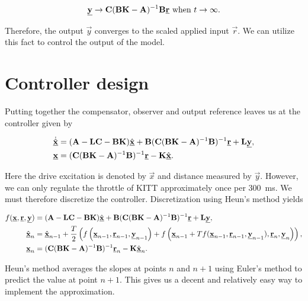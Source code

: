 \documentclass[11pt,titlepage]{report}
\begin{document}
\begin{equation}
	\mathbf{\underline{y}} \to \mathbf{C} (\mathbf{B} \mathbf{K} - \mathbf{A})^{-1} \mathbf{B} \mathbf{\underline{r}} \text{ when } t \to \infty.
\end{equation}

Therefore, the output $\vec{y}$ converges to the scaled applied input $\vec{r}$. We can utilize this fact to control the output of the model.

\section{Controller design}
Putting together the compensator, observer and output reference leaves us at the controller given by

\begin{align}
	\dot{\hat{\mathbf{\underline{x}}}} &= (\mathbf{A}-\mathbf{L}\mathbf{C}-\mathbf{B}\mathbf{K}) \hat{\mathbf{\underline{x}}} + \mathbf{B}(\mathbf{C}(\mathbf{B} \mathbf{K} - \mathbf{A})^{-1} \mathbf{B})^{-1} \mathbf{\underline{r}} + \mathbf{L} \mathbf{\underline{y}}, \\
	\mathbf{\underline{x}} &= (\mathbf{C}(\mathbf{B} \mathbf{K} - \mathbf{A})^{-1} \mathbf{B})^{-1} \mathbf{\underline{r}} - \mathbf{K} \hat{\mathbf{\underline{x}}}.
\end{align}

Here the drive excitation is denoted by $\vec{x}$ and distance measured by $\vec{y}$. However, we can only regulate the throttle of KITT approximately once per \SI{300}{ms}. We must therefore discretize the controller. Discretization using Heun's method \cite{wikipedia-heuns} yields

\begin{align}
	f(\mathbf{\underline{x}},\mathbf{\underline{r}},\mathbf{\underline{y}}) &= (\mathbf{A}-\mathbf{L}\mathbf{C}-\mathbf{B}\mathbf{K}) \hat{\mathbf{\underline{x}}} + \mathbf{B}(\mathbf{C}(\mathbf{B} \mathbf{K} - \mathbf{A})^{-1} \mathbf{B})^{-1} \mathbf{\underline{r}} + \mathbf{L} \mathbf{\underline{y}}, \\
	\hat{\mathbf{\underline{x}}}_n &= \hat{\mathbf{\underline{x}}}_{n-1} + \frac{T}{2} \left( f\left(\mathbf{\underline{x}}_{n-1},\mathbf{\underline{r}}_{n-1},\mathbf{\underline{y}}_{n-1} \right) + f\left( \mathbf{\underline{x}}_{n-1} + T f(\mathbf{\underline{x}}_{n-1},\mathbf{\underline{r}}_{n-1},\mathbf{\underline{y}}_{n-1}),\mathbf{\underline{r}}_{n},\mathbf{\underline{y}}_{n}\right) \right), \\
	\mathbf{\underline{x}}_n &= (\mathbf{C}(\mathbf{B} \mathbf{K} - \mathbf{A})^{-1} \mathbf{B})^{-1} \mathbf{\underline{r}}_n - \mathbf{K} \hat{\mathbf{\underline{x}}}_n.
\end{align}

Heun's method averages the slopes at points $n$ and $n+1$ using Euler's method to predict the value at point $n+1$. This gives us a decent and relatively easy way to implement the approximation.
\end{document}
